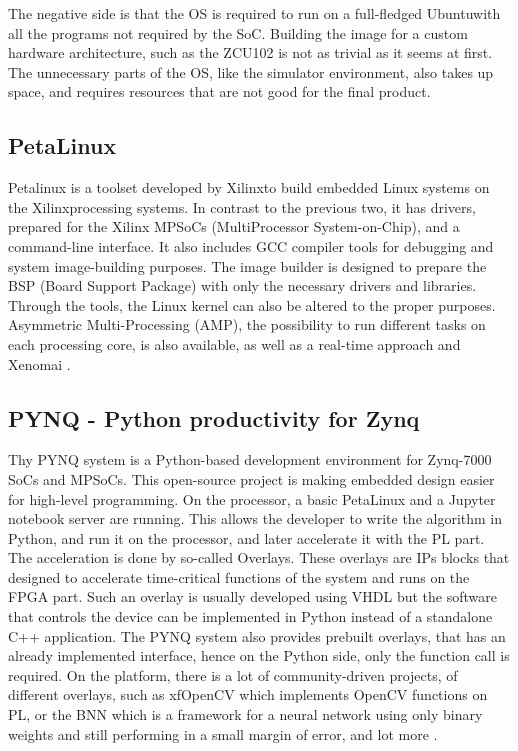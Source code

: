 The negative side is that the OS is required to run on a full-fledged Ubuntu\texttrademark with all the programs not required by the SoC.
Building the image for a custom hardware architecture, such as the ZCU102 is not as trivial as it seems at first.
The unnecessary parts of the OS, like the simulator environment, also takes up space, and requires resources that are not good for the final product.

\subsection{PetaLinux} %
Petalinux is a toolset developed by Xilinx\texttrademark to build embedded Linux systems on the Xilinx\texttrademark processing systems.
In contrast to the previous two, it has drivers, prepared for the Xilinx MPSoCs (MultiProcessor System-on-Chip), and a command-line interface. 
It also includes GCC compiler tools for debugging and system image-building purposes.
The image builder is designed to prepare the BSP (Board Support Package) with only the necessary drivers and libraries.
Through the tools, the Linux kernel can also be altered to the proper purposes.
Asymmetric Multi-Processing (AMP), the possibility to run different tasks on each processing core, is also available, as well as a real-time approach and Xenomai \cite{Xenomai}.

\subsection{PYNQ - Python productivity for Zynq} %
Thy PYNQ \cite{pynq} system is a Python-based development environment for Zynq-7000 SoCs and MPSoCs.
This open-source project is making embedded design easier for high-level programming.
On the processor, a basic PetaLinux and a Jupyter \cite{jupyter} notebook server are running.
This allows the developer to write the algorithm in Python, and run it on the processor, and later accelerate it with the PL part.
The acceleration is done by so-called Overlays.
These overlays are IPs blocks that designed to accelerate time-critical functions of the system and runs on the FPGA part.
Such an overlay is usually developed using VHDL but the software that controls the device can be implemented in Python instead of a standalone C++ application.
The PYNQ system also provides prebuilt overlays, that has an already implemented interface, hence on the Python side, only the function call is required.
On the platform, there is a lot of community-driven projects, of different overlays, such as xfOpenCV which implements OpenCV \cite{xfOpenCV_pynq} functions on PL, or the BNN \cite{finn} which is a framework for a neural network using only binary weights and still performing in a small margin of error, and lot more \cite{rybalkin2017hardware}.

